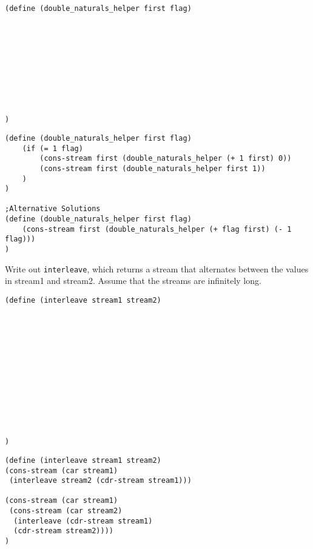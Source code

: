 \documentclass{exam}
\begin{document}
\begin{questions}
\begin{blocksection}
\begin{lstlisting}
(define (double_naturals_helper first flag)










)

\end{lstlisting}

\begin{solution}
\begin{lstlisting}
(define (double_naturals_helper first flag)
    (if (= 1 flag)
        (cons-stream first (double_naturals_helper (+ 1 first) 0))
        (cons-stream first (double_naturals_helper first 1))
    )
)

;Alternative Solutions
(define (double_naturals_helper first flag)
    (cons-stream first (double_naturals_helper (+ flag first) (- 1 flag)))
)
\end{lstlisting}
\end{solution}
\end{blocksection}

\begin{blocksection}
\question Write out \texttt{interleave}, which returns a stream that alternates between the values in stream1 and stream2. Assume that the streams are infinitely long.
\begin{lstlisting}
(define (interleave stream1 stream2)













)
\end{lstlisting}

\begin{solution}
\begin{lstlisting}
(define (interleave stream1 stream2)
(cons-stream (car stream1) 
 (interleave stream2 (cdr-stream stream1)))

(cons-stream (car stream1)
 (cons-stream (car stream2)
  (interleave (cdr-stream stream1)
  (cdr-stream stream2))))
)
\end{lstlisting}
\end{solution}
\end{blocksection}


\end{questions}

\end{document}
